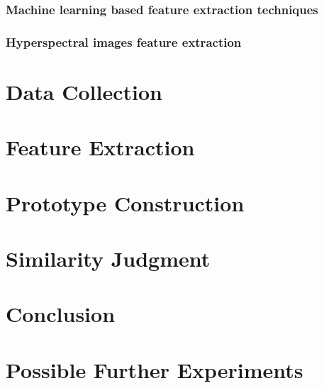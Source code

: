 \documentclass[conference]{IEEEtran}
\begin{document}
			
		\subsubsection{Machine learning based feature extraction techniques}
			
		
		\subsubsection{Hyperspectral images feature extraction}
			
\section{Data Collection}
\section{Feature Extraction}
\section{Prototype Construction}
\section{Similarity Judgment}


\section{Conclusion}
\section{Possible Further Experiments}

\end{document}
